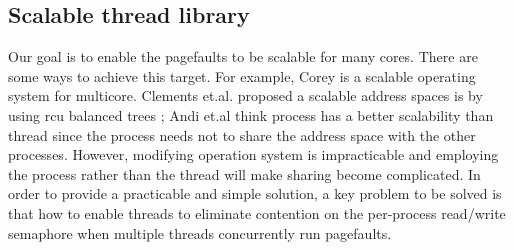 




\subsection{Scalable thread library}

Our goal is to enable the pagefaults to be scalable  for many cores.
There are some ways to achieve this target. 
For example, Corey\cite{boyd2008corey} is a scalable operating system for multicore.
Clements et.al. proposed a scalable address spaces is by using rcu balanced trees \cite{Clements2012Scalable};
Andi et.al think process has a better scalability than thread since the process needs not to share the address space with the other processes\cite{Andi2009lmulticore}.
However, modifying operation system is impracticable and employing the process rather than the thread will make sharing become complicated. 
In order to provide a practicable and simple solution, a key problem to be solved is that how to enable threads to eliminate contention on the per-process read/write semaphore when multiple threads concurrently run pagefaults.






